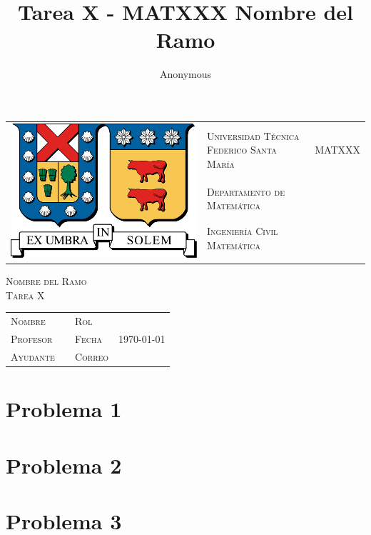 \documentclass[letterpaper,12pt]{article}
\title{Tarea X - MATXXX Nombre del Ramo}
\author{ Anonymous }
\begin{document}
\thispagestyle{empty}
{\small
\begin{tabular}{llr}
    \multirow{4}{*}{\includegraphics[scale=0.12]{utfsm.pdf}} & \textsc{Universidad Técnica Federico Santa María} & \hspace{3em} \multirow{3}{*} {\large \textsc{MATXXX}} \\
    &  \textsc{Departamento de Matemática} \\
    &  \textsc{Ingeniería Civil Matemática} \\
    &
\end{tabular}
}

\begin{center}
    \huge{\textsc{Nombre del Ramo\\Tarea X}}
\end{center}

\vspace{1em}

\begin{tabular}{llll}
    \textsc{Nombre} &  & \textsc{Rol} & \\
    \textsc{Profesor} &  & \textsc{Fecha} & \today\\
    \textsc{Ayudante} &  & \textsc{Correo} &
\end{tabular}

\section*{Problema 1}
\vspace{0.8em}
    
\clearpage

\section*{Problema 2}
\vspace{0.8em}
    
\clearpage

\section*{Problema 3}
\vspace{0.8em}
    
\clearpage
\end{document}
